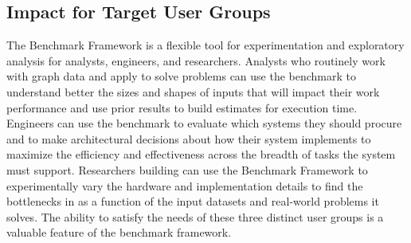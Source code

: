 \subsection{Impact for Target User Groups}
The \gai Benchmark Framework is a flexible tool for experimentation and exploratory analysis for analysts, engineers, and researchers.
Analysts who routinely work with graph data and apply \gai to solve problems can use the \gai benchmark to understand better the sizes and shapes of inputs that will impact their work performance and use prior results to build estimates for \gai execution time. 
Engineers can use the \gai benchmark to evaluate which systems they should procure and to make architectural decisions about how their system implements \gai to maximize the efficiency and effectiveness across the breadth of tasks the system must support.
Researchers building \gai can use the \gai Benchmark Framework to experimentally vary the hardware and implementation details to find the bottlenecks in \gai as a function of the input datasets and real-world problems it solves. 
The ability to satisfy the needs of these three distinct user groups is a valuable feature of the \gai benchmark framework.

